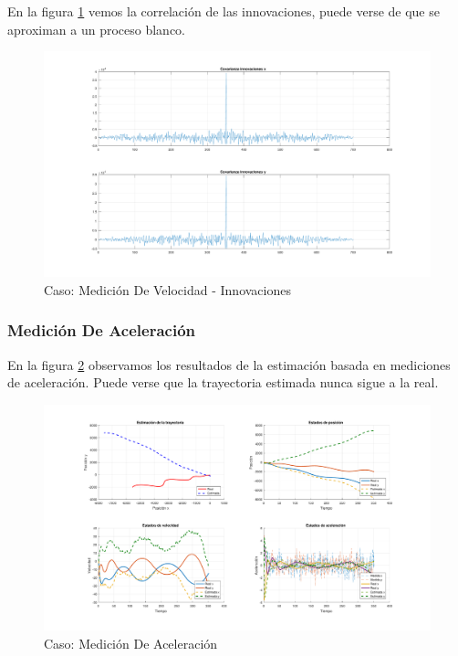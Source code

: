 		En la figura \ref{fig:ej2b_innov} vemos la correlación de las innovaciones, puede verse de que se aproximan a un proceso blanco.
		
		\begin{figure}[H]
			\centering
			\includegraphics[width=1.0\textwidth,keepaspectratio]{Figuras/covinn_ej2b.pdf}
			\caption{Caso: Medición De Velocidad - Innovaciones}
			\label{fig:ej2b_innov}
		\end{figure}
			
		\subsubsection{Medición De Aceleración}
		
		En la figura \ref{fig:ej2c} observamos los resultados de la estimación basada en mediciones de aceleración. Puede verse que la trayectoria estimada nunca sigue a la real.
		
		\begin{figure}[H]
			\centering
			\includegraphics[width=1.0\textwidth,keepaspectratio]{Figuras/graf_ej2c.pdf}
			\caption{Caso: Medición De Aceleración}
			\label{fig:ej2c}
		\end{figure}
		
